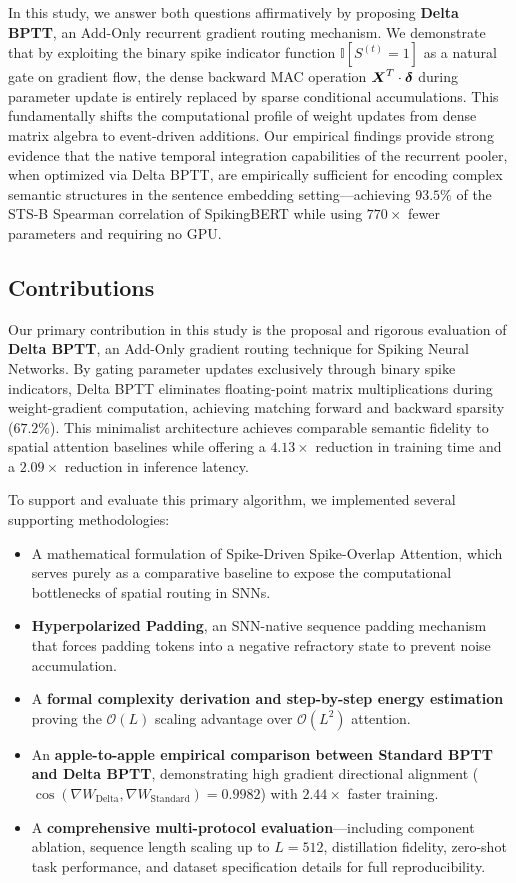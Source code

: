 \documentclass[10pt,a4paper,twoside]{article}
\begin{document}
In this study, we answer both questions affirmatively by proposing \textbf{Delta BPTT}, an Add-Only recurrent gradient routing mechanism. We demonstrate that by exploiting the binary spike indicator function $\mathbb{I}[S^{(t)} = 1]$ as a natural gate on gradient flow, the dense backward MAC operation $\boldsymbol{X}^T \cdot \boldsymbol{\delta}$ during parameter update is entirely replaced by sparse conditional accumulations. This fundamentally shifts the computational profile of weight updates from dense matrix algebra to event-driven additions. Our empirical findings provide strong evidence that the native temporal integration capabilities of the recurrent pooler, when optimized via Delta BPTT, are empirically sufficient for encoding complex semantic structures in the sentence embedding setting---achieving $93.5\%$ of the STS-B Spearman correlation of SpikingBERT \cite{bal2024spikingbert} while using $770\times$ fewer parameters and requiring no GPU.

\subsection{Contributions}
Our primary contribution in this study is the proposal and rigorous evaluation of \textbf{Delta BPTT}, an Add-Only gradient routing technique for Spiking Neural Networks. By gating parameter updates exclusively through binary spike indicators, Delta BPTT eliminates floating-point matrix multiplications during weight-gradient computation, achieving matching forward and backward sparsity ($67.2\%$). This minimalist architecture achieves comparable semantic fidelity to spatial attention baselines while offering a $4.13\times$ reduction in training time and a $2.09\times$ reduction in inference latency.

To support and evaluate this primary algorithm, we implemented several supporting methodologies:
\begin{itemize}
    \item A mathematical formulation of Spike-Driven Spike-Overlap Attention, which serves purely as a comparative baseline to expose the computational bottlenecks of spatial routing in SNNs.
    \item \textbf{Hyperpolarized Padding}, an SNN-native sequence padding mechanism that forces padding tokens into a negative refractory state to prevent noise accumulation.
    \item A \textbf{formal complexity derivation and step-by-step energy estimation} proving the $\mathcal{O}(L)$ scaling advantage over $\mathcal{O}(L^2)$ attention.
    \item An \textbf{apple-to-apple empirical comparison between Standard BPTT and Delta BPTT}, demonstrating high gradient directional alignment ($\cos(\nabla W_{\text{Delta}}, \nabla W_{\text{Standard}}) = 0.9982$) with $2.44\times$ faster training.
    \item A \textbf{comprehensive multi-protocol evaluation}---including component ablation, sequence length scaling up to $L=512$, distillation fidelity, zero-shot task performance, and dataset specification details for full reproducibility.
\end{itemize}
\end{document}
